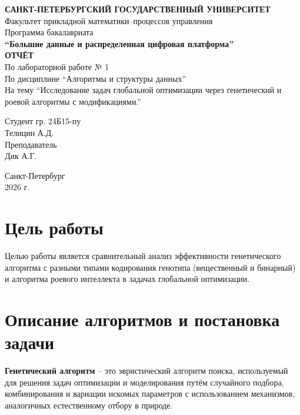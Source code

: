 \documentclass[12pt,a4paper]{article}
\begin{document}
\begin{titlepage}
    \centering
    {\large \textbf{САНКТ-ПЕТЕРБУРГСКИЙ ГОСУДАРСТВЕННЫЙ УНИВЕРСИТЕТ}} \\[0.5cm]
    {\large Факультет прикладной математики--процессов управления} \\[0.5cm]
    {\large Программа бакалавриата} \\[0.2cm]
    {\large \textbf{``Большие данные и распределенная цифровая платформа''}} \\[4.5cm]
    
    {\Large \textbf{ОТЧЁТ}} \\[0.3cm]
    {\large По лабораторной работе № 1} \\[0.2cm]
    {\large По дисциплине ``Алгоритмы и структуры данных''} \\[0.2cm]
    {\large На тему ``Исследование задач глобальной оптимизации через генетический и роевой алгоритмы с модификациями.''} \\[4cm]
    
    \begin{flushright}
        Студент гр. 24Б15-пу \\
        Телицин А.Д. \\[0.5cm]
        Преподаватель \\
        Дик А.Г. \\[1cm]
    \end{flushright}
    
    \vfill
    \centering
    Санкт-Петербург \\
    2026 г.
\end{titlepage}

\tableofcontents
\newpage

\section{Цель работы}
\label{sec:goal}

Целью работы является сравнительный анализ эффективности генетического алгоритма с разными типами кодирования генотипа (вещественный и бинарный) и алгоритма роевого интеллекта в задачах глобальной оптимизации.

\section{Описание алгоритмов и постановка задачи}
\label{sec:algorithms}

\textbf{Генетический алгоритм} -- это эвристический алгоритм поиска, используемый для решения задач оптимизации и моделирования путём случайного подбора, комбинирования и вариации искомых параметров с использованием механизмов, аналогичных естественному отбору в природе.
\end{document}

